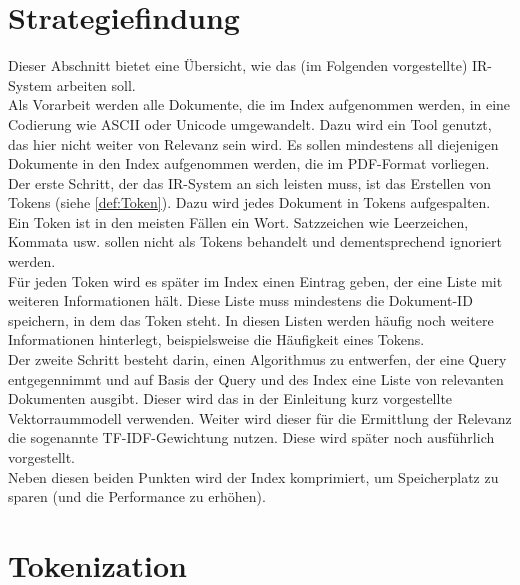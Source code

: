 \section{Strategiefindung}
Dieser Abschnitt bietet eine Übersicht, wie das (im Folgenden vorgestellte) IR-System arbeiten soll.
\\
Als Vorarbeit werden alle Dokumente, die im Index aufgenommen werden, in eine Codierung wie ASCII oder Unicode umgewandelt. Dazu wird ein Tool genutzt, das hier nicht weiter von Relevanz sein wird.
Es sollen mindestens all diejenigen Dokumente in den Index aufgenommen werden, die im PDF-Format vorliegen.
\\
Der erste Schritt, der das IR-System an sich leisten muss, ist das Erstellen von Tokens (siehe \cref{def:Token}). Dazu wird jedes Dokument in Tokens aufgespalten. Ein Token ist in den meisten Fällen ein Wort. Satzzeichen wie Leerzeichen, Kommata usw. sollen nicht als Tokens behandelt und dementsprechend ignoriert werden.
\\
Für jeden Token wird es später im Index einen Eintrag geben, der eine Liste mit weiteren Informationen hält. Diese Liste muss mindestens die Dokument-ID speichern, in dem das Token steht. In diesen Listen werden häufig noch weitere Informationen hinterlegt, beispielsweise die Häufigkeit eines Tokens.
\\
Der zweite Schritt besteht darin, einen Algorithmus zu entwerfen, der eine Query entgegennimmt und auf Basis der Query und des Index eine Liste von relevanten Dokumenten ausgibt. Dieser wird das in der Einleitung kurz vorgestellte Vektorraummodell verwenden. Weiter wird dieser für die Ermittlung der Relevanz die sogenannte TF-IDF-Gewichtung nutzen. Diese wird später noch ausführlich vorgestellt.
\\
Neben diesen beiden Punkten wird der Index komprimiert, um Speicherplatz zu sparen (und die Performance zu erhöhen).

\section{Tokenization}
